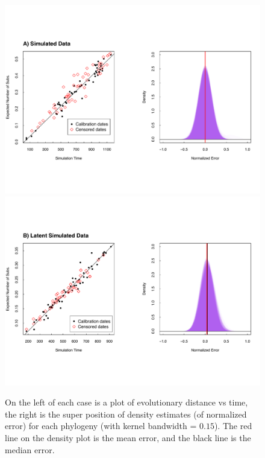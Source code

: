 \documentclass[12pt]{article}
\begin{document}
\begin{figure}[p]
	\centering
	\includegraphics[width=\textwidth]{figures/simulated.pdf} 
	\includegraphics[width=\textwidth]{figures/simulated_latent.pdf}\\
	\caption[Simulated Data]{On the left of each case is a plot of evolutionary distance vs time, the right is the super position of density estimates (of normalized error) for each phylogeny (with kernel bandwidth = $0.15$). The red line on the density plot is the mean error, and the black line is the median error. }
	 \label{fig:results1}
\end{figure}
\end{document}
